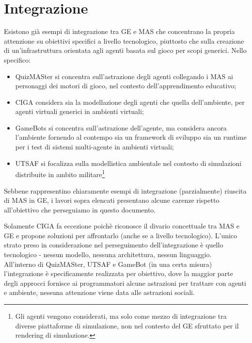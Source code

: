 \section{Integrazione}

Esistono già esempi di integrazione tra GE e MAS che concentrano la propria attenzione su obiettivi specifici a livello tecnologico, piuttosto che sulla creazione di un'infrastruttura orientata agli agenti basata sul gioco per scopi generici. Nello specifico:
\begin{itemize}
    \item QuizMASter \cite{5763564} si concentra sull'astrazione degli agenti collegando i MAS ai personaggi dei motori di gioco, nel contesto dell'apprendimento educativo;
    \item CIGA \cite{ciga} considera sia la modellazione degli agenti che quella dell'ambiente, per agenti virtuali generici in ambienti virtuali;
    \item GameBots \cite{gamebots} si concentra sull'astrazione dell'agente, ma considera ancora l'ambiente fornendo al contempo sia un framework di sviluppo sia un runtime per i test di sistemi multi-agente in ambienti virtuali;
    \item UTSAF \cite{utsaf} si focalizza sulla modellistica ambientale nel contesto di simulazioni distribuite in ambito militare\footnote{Gli agenti vengono considerati, ma solo come mezzo di integrazione tra diverse piattaforme di simulazione, non nel contesto del GE sfruttato per il rendering di simulazione.}
\end{itemize}

Sebbene rappresentino chiaramente esempi di integrazione (parzialmente) riuscita di MAS in GE, i lavori sopra elencati presentano alcune carenze rispetto all'obiettivo che perseguiamo in questo documento.

\smallskip

Solamente CIGA fa eccezione poichè riconosce il divario concettuale tra MAS e GE e propone soluzioni per affrontarlo (anche se a livello tecnologico). L'unico strato preso in considerazione nel perseguimento dell'integrazione è quello tecnologico - nessun modello, nessuna architettura, nessun linguaggio.\\ All'interno di QuizMASter, UTSAF e GameBot (in una certa misura) l'integrazione è specificamente realizzata per obiettivo, dove la maggior parte degli approcci fornisce ai programmatori alcune astrazioni per trattare con agenti e ambiente, nessuna attenzione viene data alle astrazioni sociali.\cite{gamemas-woa2016}
